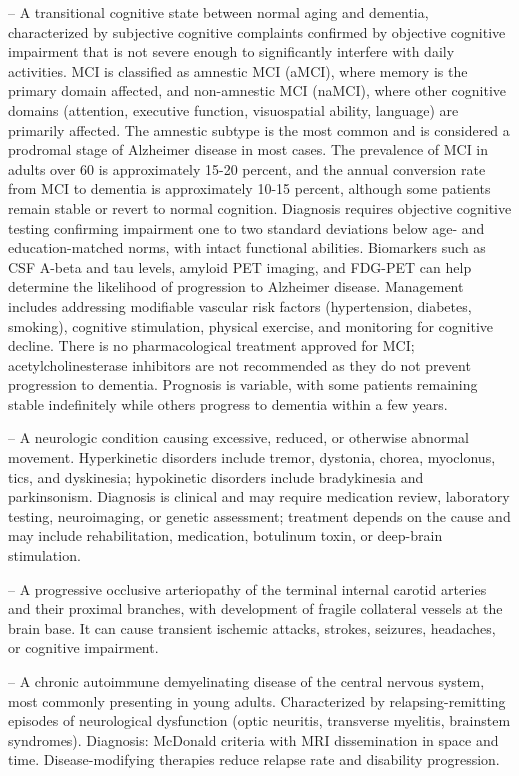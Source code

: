 -- A transitional cognitive state between normal aging and dementia, characterized by subjective cognitive complaints confirmed by objective cognitive impairment that is not severe enough to significantly interfere with daily activities. MCI is classified as amnestic MCI (aMCI), where memory is the primary domain affected, and non-amnestic MCI (naMCI), where other cognitive domains (attention, executive function, visuospatial ability, language) are primarily affected. The amnestic subtype is the most common and is considered a prodromal stage of Alzheimer disease in most cases. The prevalence of MCI in adults over 60 is approximately 15-20 percent, and the annual conversion rate from MCI to dementia is approximately 10-15 percent, although some patients remain stable or revert to normal cognition. Diagnosis requires objective cognitive testing confirming impairment one to two standard deviations below age- and education-matched norms, with intact functional abilities. Biomarkers such as CSF A-beta and tau levels, amyloid PET imaging, and FDG-PET can help determine the likelihood of progression to Alzheimer disease. Management includes addressing modifiable vascular risk factors (hypertension, diabetes, smoking), cognitive stimulation, physical exercise, and monitoring for cognitive decline. There is no pharmacological treatment approved for MCI; acetylcholinesterase inhibitors are not recommended as they do not prevent progression to dementia. Prognosis is variable, with some patients remaining stable indefinitely while others progress to dementia within a few years.

-- A neurologic condition causing excessive, reduced, or otherwise abnormal movement. Hyperkinetic disorders include tremor, dystonia, chorea, myoclonus, tics, and dyskinesia; hypokinetic disorders include bradykinesia and parkinsonism. Diagnosis is clinical and may require medication review, laboratory testing, neuroimaging, or genetic assessment; treatment depends on the cause and may include rehabilitation, medication, botulinum toxin, or deep-brain stimulation.

-- A progressive occlusive arteriopathy of the terminal internal carotid arteries and their proximal branches, with development of fragile collateral vessels at the brain base. It can cause transient ischemic attacks, strokes, seizures, headaches, or cognitive impairment.

-- A chronic autoimmune demyelinating disease of the central nervous system, most commonly presenting in young adults. Characterized by relapsing-remitting episodes of neurological dysfunction (optic neuritis, transverse myelitis, brainstem syndromes). Diagnosis: McDonald criteria with MRI dissemination in space and time. Disease-modifying therapies reduce relapse rate and disability progression.

